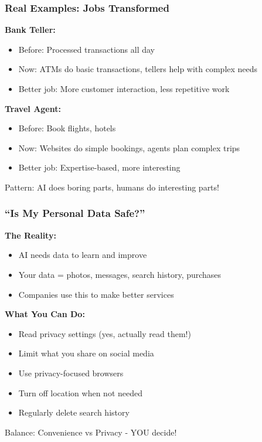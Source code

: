 \begin{frame}[fragile]\frametitle{Real Examples: Jobs Transformed}

{\bf Bank Teller:}
\begin{itemize}
\item Before: Processed transactions all day
\item Now: ATMs do basic transactions, tellers help with complex needs
\item Better job: More customer interaction, less repetitive work
\end{itemize}

{\bf Travel Agent:}
\begin{itemize}
\item Before: Book flights, hotels
\item Now: Websites do simple bookings, agents plan complex trips
\item Better job: Expertise-based, more interesting
\end{itemize}

Pattern: AI does boring parts, humans do interesting parts!
\end{frame}

\begin{frame}[fragile]\frametitle{``Is My Personal Data Safe?''}

{\bf The Reality:}
\begin{itemize}
\item AI needs data to learn and improve
\item Your data = photos, messages, search history, purchases
\item Companies use this to make better services
\end{itemize}

{\bf What You Can Do:}
\begin{itemize}
\item Read privacy settings (yes, actually read them!)
\item Limit what you share on social media
\item Use privacy-focused browsers
\item Turn off location when not needed
\item Regularly delete search history
\end{itemize}

Balance: Convenience vs Privacy - YOU decide!
\end{frame}

